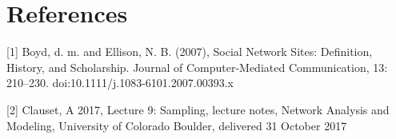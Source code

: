 \documentclass{article}
\begin{document}
\section*{References}
\small

[1] Boyd, d. m. and Ellison, N. B. (2007), Social Network Sites: Definition, History, and Scholarship. Journal of Computer-Mediated Communication, 13: 210–230. doi:10.1111/j.1083-6101.2007.00393.x

[2] Clauset, A 2017, Lecture 9: Sampling, lecture notes, Network Analysis and Modeling, University of Colorado Boulder, delivered 31 October 2017
\end{document}
